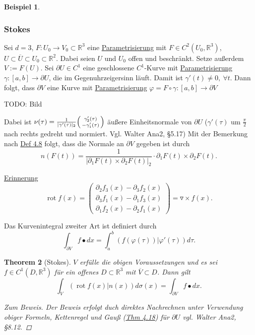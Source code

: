 \documentclass[a4paper]{report}
\newcommand{\R}{\mathbb{R}}
\newenvironment{jsmallmatrix}{\left( \begin{smallmatrix}}{\end{smallmatrix} \right)}
\newcommand{\jlabel}[1]{\label{j_#1}}
\newcommand{\jhyperref}[2]{\hyperref[j_#1]{#2}}
\newcommand{\jlink}[1]{\jhyperref{#1}{#1}}
\newcommand{\jabb}[3]{ #1: #2 \rightarrow #3 }
\newcommand{\jspace}{\vspace{8pt}}
\newcommand{\rot}{\mathop{\mathrm{{rot}}}}
\theoremstyle{plain}
\newtheorem{thm}{Theorem}[chapter]
\theoremstyle{definition}
\newtheorem{expl}[thm]{Beispiel}
\begin{document}
{{{{\begin{expl}
\end{expl}

\subsubsection{Stokes}

Sei $d=3$, $\jabb{F}{U_0}{V_0} \subset \R^3$ eine \jlink{Parametrisierung} mit $F\in C^2(U_0,\R^3)$, $U\subset \overline{U} \subset U_0 \subset \R^2$. Dabei seien $U$ und $U_0$ offen und beschränkt. Setze außerdem $V:= F(U)$. Sei $\partial U\in C^1$ eine geschlossene $C^1$-Kurve mit \jlink{Parametrisierung} $\jabb{\gamma}{[a,b]}{\partial U}$, die im Gegenuhrzeigersinn läuft. Damit ist $\gamma'(t) \ne 0,\ \forall t$. Dann folgt, dass $\partial V$ eine Kurve mit \jlink{Parametrisierung} $\varphi = \jabb{F \circ \gamma}{[a,b]}{\partial V}$

\jspace

TODO: Bild

\jspace

Dabei ist $\nu(\tau) = \frac{1}{|\gamma'(\tau)|_2}\begin{jsmallmatrix}
                                                      \gamma_2'(\tau)\\ -\gamma_1'(\tau)
                                                  \end{jsmallmatrix}$ äußere Einheitsnormale von $\partial U$ ($\gamma'(\tau)$ um $\frac{\pi}{2}$ nach rechts gedreht und normiert. Vgl. Walter Ana2, §5.17)
Mit der Bemerkung nach \jlink{Def 4.8} folgt, dass die Normale an $\partial V$ gegeben ist durch
\begin{equation}
    \jlabel{(4.11)}
    n(F(t)) = \frac{1}{|\partial_1 F(t) \times \partial_2 F(t)|_2}\cdot \partial_1 F(t) \times \partial_2 F(t).
\end{equation}

\uline{Erinnerung}
\[
    \rot f(x) = \begin{pmatrix}
                    \partial_2 f_3(x) - \partial_3 f_2(x)\\
                    \partial_3 f_1(x) - \partial_1 f_3(x)\\
                    \partial_1 f_2(x) - \partial_2 f_1(x)
                \end{pmatrix} = \triangledown \times f(x).
\]

Das Kurvenintegral zweiter Art ist definiert durch
\[
    \int_{\partial V} f \bullet dx = \int_a^b (f(\varphi(\tau))|\varphi'(\tau)) d\tau.
\]

\begin{thm}[Stokes]
    \jlabel{Thm 4.22}
    \jlabel{Stokes}
    $V$ erfülle die obigen Voraussetzungen und es sei $f \in C^1(D,\R^3)$ für ein offenes $D\subset \R^3$ mit $\overline{V} \subset D$. Dann gilt
    \[
        \int_V (\rot f(x)|n(x))d\sigma(x) = \int_{\partial V} f \bullet dx.
    \]
    \begin{proof}[Zum Beweis]
        Der Beweis erfolgt duch direktes Nachrechnen unter Verwendung obiger Formeln, Kettenregel und Gauß (\jlink{Thm 4.18}) für $\partial U$ vgl. Walter Ana2, §8.12.
    \end{proof}
\end{thm}

}}}}
\end{document}
